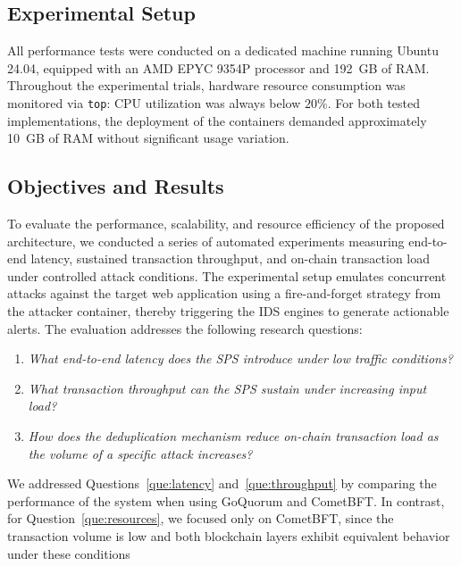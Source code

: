 \subsection{Experimental Setup}
All performance tests were conducted on a dedicated machine running Ubuntu 24.04, equipped with an AMD EPYC 9354P processor and 192~GB of RAM. Throughout the experimental trials, hardware resource consumption was monitored via \texttt{top}: CPU utilization was always below $20\%$. For both tested implementations, the deployment of the containers demanded approximately 10~GB of RAM without significant usage variation. 


\subsection{Objectives and Results}
To evaluate the performance, scalability, and resource efficiency of the proposed architecture, we conducted a series of automated experiments measuring end-to-end latency, sustained transaction throughput, and on-chain transaction load under controlled attack conditions. The experimental setup emulates concurrent attacks against the target web application using a fire-and-forget strategy from the attacker container, thereby triggering the IDS engines to generate actionable alerts. The evaluation addresses the following research questions:

\begin{enumerate}[label=Q\arabic*., ref=Q\arabic*]
    \item\label{que:latency} \textit{What end-to-end latency does the SPS introduce under low traffic conditions?}
    \item\label{que:throughput} \textit{What transaction throughput can the SPS sustain under increasing input load?}
    \item\label{que:resources} \textit{How does the deduplication mechanism reduce on-chain transaction load as the volume of a specific attack increases?}
\end{enumerate}


We addressed Questions~\ref{que:latency} and~\ref{que:throughput} by comparing the performance of the system when using GoQuorum and CometBFT. In contrast, for Question~\ref{que:resources}, we focused only on CometBFT, since the transaction volume is low and both blockchain layers exhibit equivalent behavior under these conditions


